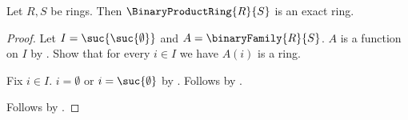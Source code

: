 \begin{proposition}\label{binary_product_ring_is_exact}
    Let $R,S$ be rings.
    Then $\BinaryProductRing{R}{S}$ is an exact ring.
\end{proposition}
\begin{proof}
    Let $I=\suc{\suc{\emptyset}}$ and $A=\binaryFamily{R}{S}$.
    $A$ is a function on $I$ by
        .
    Show that for every $i\in I$ we have $A(i)$ is a ring.
    \begin{subproof}
        Fix $i\in I$.
        $i=\emptyset$ or $i=\suc{\emptyset}$ by
            .
        Follows by .
    \end{subproof}
    Follows by .
\end{proof}
